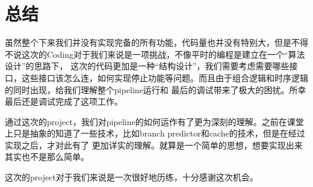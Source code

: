 \documentclass[titlepage]{article}
\begin{document}
\section{总结}
虽然整个下来我们并没有实现完备的所有功能，代码量也并没有特别大，但是不得不说这次的Coding对于我们来说是一项挑战，不像平时的编程是建立在一个“算法设计”的思路下，
这次的代码更加是一种“结构设计”，我们需要考虑需要哪些接口，这些接口该怎么连，如何实现停止功能等问题。而且由于组合逻辑和时序逻辑的同时出现，给我们理解整个pipeline运行和
最后的调试带来了极大的困扰。所幸最后还是调试完成了这项工作。

通过这次的project，我们对pipeline的如何运作有了更为深刻的理解。之前在课堂上只是抽象的知道了一些技术，比如branch predictor和cache的技术，但是在经过实现之后，才对此有了
更加详实的理解。就算是一个简单的思想，想要实现出来其实也不是那么简单。

这次的project对于我们来说是一次很好地历练，十分感谢这次机会。
\end{document}

